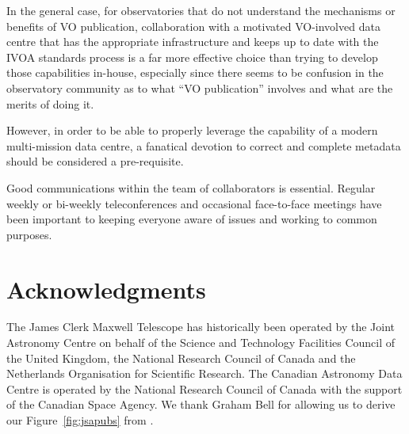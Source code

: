 \documentclass[final,authoryear,5p,times,twocolumn]{elsarticle}
\begin{document}
In the general case, for observatories that do not understand the
mechanisms or benefits of VO publication, collaboration with a
motivated VO-involved data centre that has the appropriate
infrastructure and keeps up to date with the IVOA standards process is
a far more effective choice than trying to develop those capabilities
in-house, especially since there seems to be confusion in the
observatory community as to what ``VO publication'' involves and what
are the merits of doing it.

However, in order to be able to properly leverage the capability of a
modern multi-mission data centre, a fanatical devotion to correct and
complete metadata should be considered a pre-requisite.

Good communications within the team of collaborators is essential.  Regular
weekly or bi-weekly teleconferences and occasional face-to-face meetings
have been important to keeping everyone aware of issues and working to
common purposes.

\section*{Acknowledgments}

The James Clerk Maxwell Telescope has historically been operated by
the Joint Astronomy Centre on behalf of the Science and Technology
Facilities Council of the United Kingdom, the National Research
Council of Canada and the Netherlands Organisation for Scientific
Research.  The Canadian Astronomy Data Centre is operated by the
National Research Council of Canada with the support of the Canadian
Space Agency. We thank Graham Bell for allowing us to derive our
Figure~\ref{fig:jsapubs} from \citet{2014SPIE9152-93}.
\end{document}
